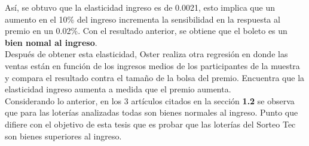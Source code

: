Así, se obtuvo que la elasticidad ingreso es de 0.0021, esto implica que un aumento en el 10\% del ingreso incrementa la sensibilidad en la respuesta al premio en un 0.02\%. Con el resultado anterior, se obtiene que el boleto es un \textbf{bien nomal al ingreso}. \\

Después de obtener esta elasticidad, Oster realiza otra regresión en donde las ventas están en función de los ingresos medios de los participantes de la muestra y compara el resultado contra el tamaño de la bolsa del premio. Encuentra que la elasticidad ingreso aumenta a medida que el premio aumenta. \\

Considerando lo anterior, en los 3 artículos citados en la sección \textbf{1.2} se observa que para las loterías analizadas todas son bienes normales al ingreso. Punto que difiere con el objetivo de esta tesis que es probar que las loterías del Sorteo Tec son bienes superiores al ingreso.








% 
    

